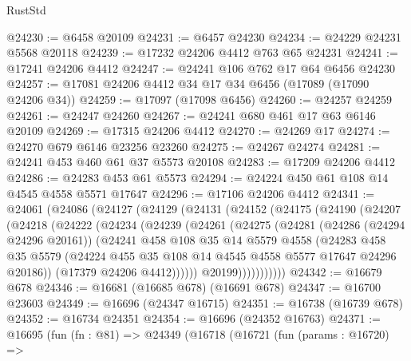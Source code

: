 \begin{lexlean}{RustStd}
\begin{coremodule}
@24230 := @6458 @20109
@24231 := @6457 @24230
@24234 := @24229 @24231 @5568 @20118
@24239 := @17232 @24206 @4412 @763 @65 @24231
@24241 := @17241 @24206 @4412
@24247 := @24241 @106 @762 @17 @64 @6456 @24230
@24257 := @17081 @24206 @4412 @34 @17 @34 @6456 (@17089 (@17090 @24206 @34))
@24259 := @17097 (@17098 @6456)
@24260 := @24257 @24259
@24261 := @24247 @24260
@24267 := @24241 @680 @461 @17 @63 @6146 @20109
@24269 := @17315 @24206 @4412
@24270 := @24269 @17
@24274 := @24270 @679 @6146 @23256 @23260
@24275 := @24267 @24274
@24281 := @24241 @453 @460 @61 @37 @5573 @20108
@24283 := @17209 @24206 @4412
@24286 := @24283 @453 @61 @5573
@24294 := @24224 @450 @61 @108 @14 @4545 @4558 @5571 @17647
@24296 := @17106 @24206 @4412
@24341 := @24061
    (@24086
      (@24127
        (@24129
          (@24131
            (@24152
              (@24175
                (@24190
                  (@24207
                    (@24218
                      (@24222
                        (@24234
                          (@24239
                            (@24261
                              (@24275
                                (@24281
                                  (@24286 (@24294 @24296 @20161))
                                  (@24241
                                    @458
                                    @108
                                    @35
                                    @14
                                    @5579
                                    @4558
                                    (@24283
                                      @458
                                      @35
                                      @5579
                                      (@24224
                                        @455
                                        @35
                                        @108
                                        @14
                                        @4545
                                        @4558
                                        @5577
                                        @17647
                                        @24296
                                        @20186))
                                    (@17379 @24206 @4412))))))
                          @20199)))))))))))
@24342 := @16679 @678
@24346 := @16681 (@16685 @678) (@16691 @678)
@24347 := @16700 @23603
@24349 := @16696 (@24347 @16715)
@24351 := @16738 (@16739 @678)
@24352 := @16734 @24351
@24354 := @16696 (@24352 @16763)
@24371 := @16695
    (fun (fn : @81) =>
    @24349
      (@16718
        (@16721
          (fun (params : @16720) =>

\end{coremodule}
\end{lexlean}
